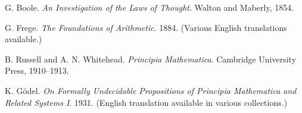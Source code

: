 \documentclass[12pt]{article}
\begin{document}
\begin{thebibliography}{9}

G. Boole.
\textit{An Investigation of the Laws of Thought}.
Walton and Maberly, 1854.

G. Frege.
\textit{The Foundations of Arithmetic}.
1884. (Various English translations available.)

B. Russell and A. N. Whitehead.
\textit{Principia Mathematica}.
Cambridge University Press, 1910--1913.

K. G\"odel.
\textit{On Formally Undecidable Propositions of Principia Mathematica and Related Systems I}.
1931. (English translation available in various collections.)

\end{thebibliography}
\end{document}

